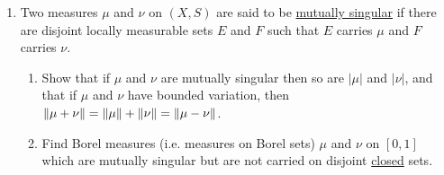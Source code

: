 \begin{enumerate}[label=\arabic*),ref=\arabic*]
\item Two measures $\mu$ and $\nu$ on $(X, S)$ are said to be \underline{mutually singular} if there are disjoint locally measurable sets $E$ and $F$ such that $E$ carries $\mu$ and $F$ carries $\nu$.
\begin{enumerate}
\item Show that if $\mu$ and $\nu$ are mutually singular then so are $|\mu|$ and $|\nu|$, and that if $\mu$ and $\nu$ have bounded variation, then $\norm{\mu+\nu}=\norm{\mu}+\norm{\nu}=\norm{\mu-\nu}$.
\item Find Borel measures (i.e. measures on Borel sets) $\mu$ and $\nu$ on $[0,1]$ which are mutually singular but are not carried on disjoint \underline{closed} sets.
\end{enumerate}
\end{enumerate}
